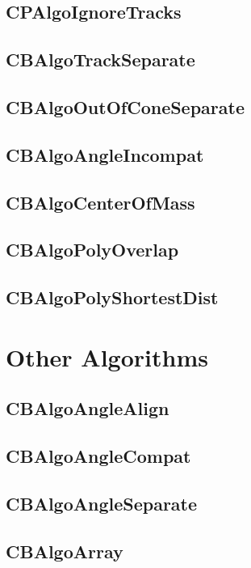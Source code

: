 \documentclass{article}
\begin{document}
\subsection{CPAlgoIgnoreTracks}\label{sec:CPAlgoIgnoreTracks}
\subsection{CBAlgoTrackSeparate}
\subsection{CBAlgoOutOfConeSeparate}
\subsection{CBAlgoAngleIncompat}\label{sec:CBAlgoAngleIncompat}
\subsection{CBAlgoCenterOfMass}\label{sec:CBAlgoCenterOfMass}
\subsection{CBAlgoPolyOverlap}\label{sec:CBAlgoPolyOverlap}
\subsection{CBAlgoPolyShortestDist}\label{sec:CBAlgoPolyShortestDist}

\section{Other Algorithms}

\subsection{CBAlgoAngleAlign}\label{sec:CBAlgoAngleAlign}
\subsection{CBAlgoAngleCompat}\label{sec:CBAlgoAngleCompat}
\subsection{CBAlgoAngleSeparate}\label{sec:CBAlgoAngleSeparate}
\subsection{CBAlgoArray}\label{sec:CBAlgoArray}
\end{document}
